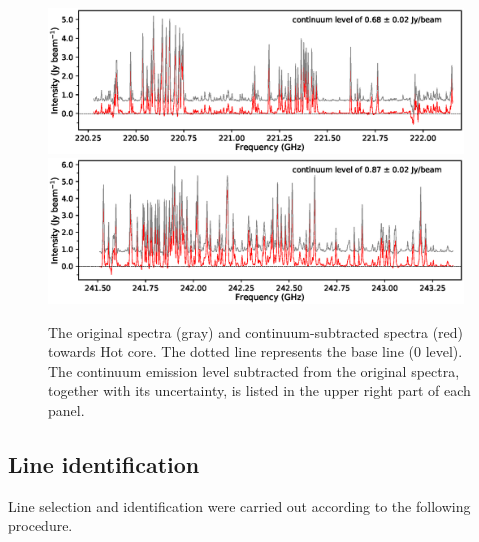 \begin{figure}[htbp]
  \centering
  \includegraphics[width=0.98\textwidth]{OrionKL/spec_spw2.eps}
  \includegraphics[width=0.98\textwidth]{OrionKL/spec_spw13.eps}
  \caption{The original spectra (gray) and continuum-subtracted spectra (red) towards Hot core. 
  The dotted line represents the base line (0 level). The continuum emission level subtracted from the original spectra, 
  together with its uncertainty, is listed in the upper right part of each panel.}
  \label{SVspec}
\end{figure}


\newpage
\subsection{Line identification}
Line selection and identification were carried out according to the following procedure.

